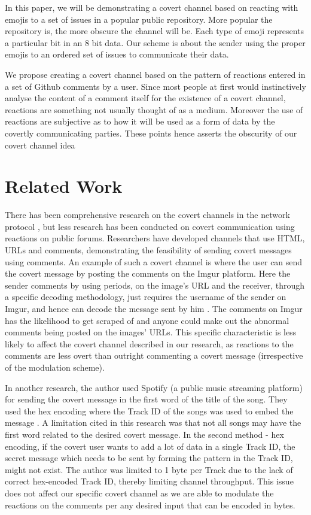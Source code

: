 \documentclass[conference]{IEEEtran}
\begin{document}
In this paper, we will be demonstrating a covert channel based on reacting with emojis to a set of issues in a popular public repository. More popular the repository is, the more obscure the channel will be. Each type of emoji represents a particular bit in an 8 bit data. Our scheme is about the sender using the proper emojis to an ordered set of issues to communicate their data. 

We propose creating a covert channel based on the pattern of reactions entered in a set of Github comments by a user. Since most people at first would instinctively analyse the content of a comment itself for the existence of a covert channel, reactions are something not usually thought of as a medium. Moreover the use of reactions are subjective as to how it will be used as a form of data by the covertly communicating parties. These points hence asserts the obscurity of our covert channel idea 

\section{Related Work}

There has been comprehensive research on the covert channels in the network protocol \cite{b1,b2,b3}, but less research has been conducted on covert communication using reactions on public forums. Researchers have developed channels that use HTML, URLs and comments, demonstrating the feasibility of sending covert messages using comments. An example of such a covert channel is where the user can send the covert message by posting the comments on the Imgur platform. Here the sender comments by using periods, on the image’s URL and the receiver, through a specific decoding methodology, just requires the username of the sender on Imgur, and hence can decode the message sent by him \cite{b4}. The comments on Imgur has the likelihood to get scraped of and anyone could make out the abnormal comments being posted on the images’ URLs. This specific characteristic is less likely to affect the covert channel described in our research, as reactions to the comments are less overt than outright commenting a covert message (irrespective of the modulation scheme).

In another research, the author used Spotify (a public music streaming platform) for sending the covert message in the first word of the title of the song. They used the hex encoding where the Track ID of the songs was used to embed the message \cite{b5}. A limitation cited in this research was that not all songs may have the first word related to the desired covert message. In the second method - hex encoding, if the covert user wants to add a lot of data in a single Track ID, the secret message which needs to be sent by forming the pattern in the Track ID, might not exist. The author was limited to 1 byte per Track due to the lack of correct hex-encoded Track ID, thereby limiting channel throughput. This issue does not affect our specific covert channel as we are able to modulate the reactions on the comments per any desired input that can be encoded in bytes.
\end{document}
